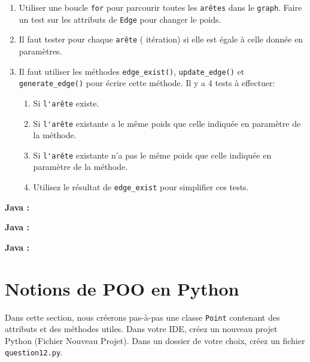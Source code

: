 \begin{Exercice}[20 minutes]
    \begin{conseil}
    \begin{enumerate}
    \item Utiliser une boucle \lstinline{for} pour parcourir toutes les \lstinline{arêtes} dans le \lstinline{graph}. Faire un test sur les attributs de \lstinline{Edge} pour changer le poids.
    \item Il faut tester pour chaque \lstinline{arête} ( itération) si elle  est égale à celle donnée en paramètres.
    \item Il faut utiliser les méthodes \lstinline{edge_exist()}, \lstinline{update_edge()} et \lstinline{generate_edge()} pour écrire cette méthode. Il y a 4 tests à effectuer: 
        \begin{enumerate}
        \item Si \lstinline{l'arête} existe.
        \item Si \lstinline{l'arête} existante a le même poids que celle indiquée en paramètre de la méthode.
        \item Si \lstinline{l'arête} existante n'a pas le même poids que celle indiquée en paramètre de la méthode.
        \item Utilisez le résultat de \lstinline{edge_exist} pour simplifier ces tests.
        \end{enumerate}
    \end{enumerate}
    \end{conseil}
    \begin{solution}
    \textbf{Java :}
         
    \end{solution}
    \begin{solution}
    \textbf{Java :}
         
    \end{solution}
    \begin{solution}
    \textbf{Java :}
         
    \end{solution}

\end{Exercice}

\newpage

\section{Notions de POO en Python}
Dans cette section, nous créerons pas-à-pas une classe \lstinline{Point} contenant des attributs et des méthodes utiles.
Dans votre IDE, créez un nouveau projet Python (Fichier \> Nouveau \> Projet). Dans un dossier de votre choix, créez un fichier \lstinline{question12.py}.

